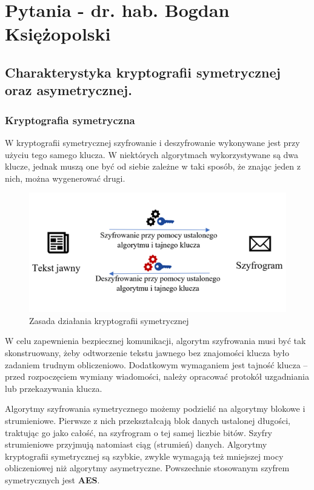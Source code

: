 \documentclass[a4paper,12pt,oneside]{book}
\begin{document}
	\tableofcontents
	\newpage

	\chapter{Pytania - dr. hab. Bogdan Księżopolski}
		
		\setcounter{section}{65}
		\section{Charakterystyka kryptografii symetrycznej oraz asymetrycznej.}
		
		\subsection*{Kryptografia symetryczna}
				
			W kryptografii symetrycznej szyfrowanie i deszyfrowanie wykonywane jest przy użyciu tego samego klucza. W niektórych algorytmach wykorzystywane są dwa klucze, jednak muszą one być od siebie zależne w taki sposób, że znając jeden z nich, można wygenerować drugi.
			
			\begin{figure}[h!]
				\centering\includegraphics[scale=0.45]{krypt_sym.png}
				\caption{Zasada działania kryptografii symetrycznej}
			\end{figure}
			
			W celu zapewnienia bezpiecznej komunikacji, algorytm szyfrowania musi być tak skonstruowany, żeby odtworzenie tekstu jawnego bez znajomości klucza było zadaniem trudnym obliczeniowo. Dodatkowym wymaganiem jest tajność klucza – przed rozpoczęciem wymiany wiadomości, należy opracować protokół uzgadniania lub przekazywania klucza.
			
			Algorytmy szyfrowania symetrycznego możemy podzielić na algorytmy blokowe i strumieniowe. Pierwsze z nich przekształcają blok danych ustalonej długości, traktując go jako całość, na szyfrogram o tej samej liczbie bitów. Szyfry strumieniowe przyjmują natomiast ciąg (strumień) danych. Algorytmy kryptografii symetrycznej są szybkie, zwykle wymagają też mniejszej mocy obliczeniowej niż algorytmy asymetryczne. Powszechnie stosowanym szyfrem symetrycznych jest \textbf{AES}.
			
\end{document}
